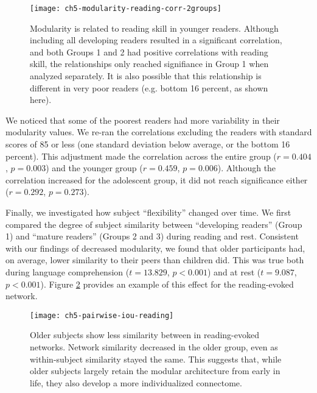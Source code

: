 \begin{figure}[t]
	\centering
	\texttt{[image: ch5-modularity-reading-corr-2groups]}
    \caption[Modularity is related to reading skill in younger readers.]{Modularity is related to reading skill in younger readers. Although including all developing readers resulted in a significant correlation, and both Groups 1 and 2 had positive correlations with reading skill, the relationships only reached signifiance in Group 1 when analyzed separately. It is also possible that this relationship is different in very poor readers (e.g. bottom 16 percent, as shown here).}
	\label{fig:ch5-modularity-reading-corr-2groups}
\end{figure}

We noticed that some of the poorest readers had more variability in their modularity values. We re-ran the correlations excluding the readers with standard scores of 85 or less (one standard deviation below average, or the bottom 16 percent). This adjustment made the correlation across the entire group ($r = 0.404$, $p = 0.003$) and the younger group ($r = 0.459$, $p = 0.006$). Although the correlation increased for the adolescent group, it did not reach significance either ($r = 0.292$, $p = 0.273$).

Finally, we investigated how subject ``flexibility'' changed over time. We first compared the degree of subject similarity between ``developing readers'' (Group 1) and ``mature readers'' (Groups 2 and 3) during reading and rest. Consistent with our findings of decreased modularity, we found that older participants had, on average, lower similarity to their peers than children did. This was true both during language comprehension ($t = 13.829$, $p < 0.001$) and at rest ($t = 9.087$, $p < 0.001$). Figure \ref{fig:ch5-pairwise-iou-reading} provides an example of this effect for the reading-evoked network.

\begin{figure}[t]
	\centering
	\texttt{[image: ch5-pairwise-iou-reading]}
    \caption[Older subjects show less similarity between in reading-evoked networks.]{Older subjects show less similarity between in reading-evoked networks. Network similarity decreased in the older group, even as within-subject similarity stayed the same. This suggests that, while older subjects largely retain the modular architecture from early in life, they also develop a more individualized connectome.}
	\label{fig:ch5-pairwise-iou-reading}
\end{figure}

